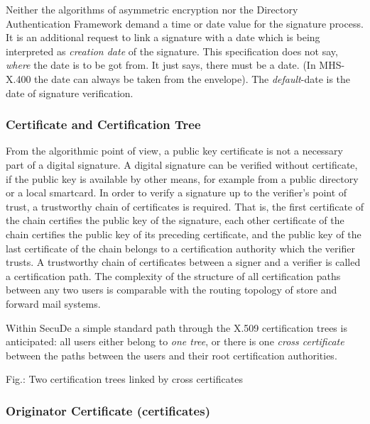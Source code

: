 Neither the algorithms of asymmetric encryption nor the Directory
Authentication Framework demand
a time or date value for the signature process.
It is an additional request to link a signature with a date
which is being interpreted as
{\em creation date} of the signature.
This specification does not say, {\em where} the date is to be got from.
It just says, there must be a date.
(In MHS-X.400 the date can always be taken from the envelope).
The {\em default}-date is the date of signature verification.

\subsubsection{Certificate and Certification Tree}
\label{sc-cct}

From the algorithmic point of view, a public key certificate is
not a necessary part of a digital signature.
A digital signature can be verified without certificate,
if the public key is available by other means,
for example from a public directory or a local smartcard.
In order to verify a signature up to the verifier's point of trust,
a trustworthy chain of certificates is required.
That is,
the first certificate of the chain certifies the public key of the signature,
each other certificate of the chain certifies the public key
of its preceding certificate,
and the public key of the last certificate of the chain
belongs to a certification authority which the verifier trusts.
A trustworthy chain of certificates between a signer and a verifier
is called a certification path.
The complexity of the structure of all
certification paths between any two users
is comparable with the routing topology of store and forward
mail systems.

Within SecuDe a simple standard path through the
X.509 certification trees is anticipated:
all users either belong to {\em one tree},
or there is one {\em cross certificate} between the paths
between the users and their root certification authorities.

\begin{center}
\end{center}
\label{fig-sc-cct}
{\footnotesize Fig.: Two certification trees linked by cross certificates}
 
\subsubsection{Originator Certificate (certificates)}
\label{sc-oc}

